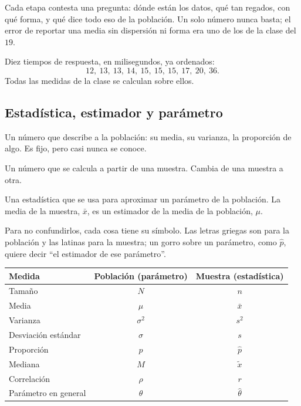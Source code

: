 \documentclass[11pt,letterpaper]{article}
\begin{document}
Cada etapa contesta una pregunta: dónde están los datos, qué tan
regados, con qué forma, y qué dice todo eso de la población. Un solo
número nunca basta; el error de reportar una media sin dispersión ni
forma era uno de los de la clase del $19$.

\begin{ejemplo}
    Diez tiempos de respuesta, en milisegundos, ya ordenados:
    \[
        12,\ 13,\ 13,\ 14,\ 15,\ 15,\ 15,\ 17,\ 20,\ 36 .
    \]
    Todas las medidas de la clase se calculan sobre ellos.
\end{ejemplo}


\subsection*{Estadística, estimador y parámetro}

\begin{definicion}[Parámetro]
    Un número que describe a la población: su media, su varianza, la
    proporción de algo. Es fijo, pero casi nunca se conoce.
\end{definicion}

\begin{definicion}[Estadística]
    Un número que se calcula a partir de una muestra. Cambia de una
    muestra a otra.
\end{definicion}

\begin{definicion}[Estimador]
    Una estadística que se usa para aproximar un parámetro de la
    población. La media de la muestra, $\bar{x}$, es un estimador de
    la media de la población, $\mu$.
\end{definicion}

Para no confundirlos, cada cosa tiene su símbolo. Las letras griegas
son para la población y las latinas para la muestra; un gorro sobre un
parámetro, como $\hat{p}$, quiere decir ``el estimador de ese
parámetro''.

\begin{center}
\begin{tabular}{lcc}
    \toprule
    \textbf{Medida} & \textbf{Población (parámetro)}
    & \textbf{Muestra (estadística)} \\
    \midrule
    Tamaño & $N$ & $n$ \\
    Media & $\mu$ & $\bar{x}$ \\
    Varianza & $\sigma^2$ & $s^2$ \\
    Desviación estándar & $\sigma$ & $s$ \\
    Proporción & $p$ & $\hat{p}$ \\
    Mediana & $M$ & $\tilde{x}$ \\
    Correlación & $\rho$ & $r$ \\
    Parámetro en general & $\theta$ & $\hat{\theta}$ \\
    \bottomrule
\end{tabular}
\end{center}
\end{document}
